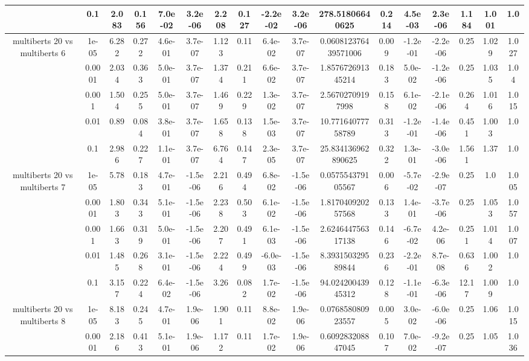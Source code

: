 \begin{tabular}{|c|c|c|c|c|c|c|c|c|c|c|c|c|c|c|c|c|}
 & 0.1 & 2.083 & 0.156 & 7.0e-02 & 3.2e-06 & 2.208 & 0.127 & -2.2e-02 & 3.2e-06 & 278.51806640625 & 0.214 & 4.5e-03 & 2.3e-06 & 1.184 & 1.001 & 1.0 \\
\hline
\multirow{5}{*}{multiberts 20 vs multiberts 6} & 1e-05 & 6.282 & 0.272 & 4.6e-01 & 3.7e-07 & 1.123 & 0.11 & 6.4e-02 & 3.7e-07 & 0.060812376439571006 & 0.009 & -1.2e-01 & -2.2e-06 & 0.25 & 1.029 & 1.027 \\
 & 0.0001 & 2.034 & 0.363 & 5.0e-01 & 3.7e-07 & 1.374 & 0.211 & 6.6e-02 & 3.7e-07 & 1.857672691345214 & 0.183 & 5.0e-02 & -1.2e-06 & 0.25 & 1.035 & 1.04 \\
 & 0.001 & 1.504 & 0.255 & 5.0e-01 & 3.7e-07 & 1.469 & 0.229 & 1.3e-02 & 3.7e-07 & 2.56702709197998 & 0.158 & 6.1e-02 & -2.1e-06 & 0.264 & 1.016 & 1.015 \\
 & 0.01 & 0.89 & 0.084 & 3.8e-01 & 3.7e-07 & 1.658 & 0.138 & 1.5e-03 & 3.7e-07 & 10.77164077758789 & 0.313 & -1.2e-01 & -1.4e-06 & 0.451 & 1.003 & 1.0 \\
 & 0.1 & 2.986 & 0.227 & 1.1e-01 & 3.7e-07 & 6.764 & 0.147 & 2.3e-05 & 3.7e-07 & 25.834136962890625 & 0.322 & 1.3e-01 & -3.0e-06 & 1.561 & 1.37 & 1.0 \\
\hline
\multirow{5}{*}{multiberts 20 vs multiberts 7} & 1e-05 & 5.78 & 0.183 & 4.7e-01 & -1.5e-06 & 2.216 & 0.494 & 6.8e-02 & -1.5e-06 & 0.057554379105567 & 0.006 & -5.7e-02 & -2.9e-07 & 0.25 & 1.0 & 1.005 \\
 & 0.0001 & 1.803 & 0.343 & 5.1e-01 & -1.5e-06 & 2.238 & 0.503 & 6.1e-02 & -1.5e-06 & 1.817040920257568 & 0.133 & 1.4e-01 & -3.7e-06 & 0.25 & 1.053 & 1.057 \\
 & 0.001 & 1.663 & 0.319 & 5.0e-01 & -1.5e-06 & 2.207 & 0.491 & 6.1e-03 & -1.5e-06 & 2.624644756317138 & 0.146 & -6.7e-02 & 4.2e-06 & 0.251 & 1.014 & 1.007 \\
 & 0.01 & 1.485 & 0.268 & 3.1e-01 & -1.5e-06 & 2.224 & 0.499 & -6.0e-03 & -1.5e-06 & 8.393150329589844 & 0.236 & -2.2e-01 & 8.7e-08 & 0.636 & 1.002 & 1.0 \\
 & 0.1 & 3.157 & 0.224 & 6.4e-02 & -1.5e-06 & 3.26 & 0.082 & 1.7e-02 & -1.5e-06 & 94.02420043945312 & 0.128 & -1.1e-01 & -6.3e-06 & 12.17 & 1.009 & 1.0 \\
\hline
\multirow{5}{*}{multiberts 20 vs multiberts 8} & 1e-05 & 8.183 & 0.245 & 4.7e-01 & 1.9e-06 & 1.901 & 0.11 & 8.8e-02 & 1.9e-06 & 0.076858080923557 & 0.005 & 3.0e-02 & -6.0e-06 & 0.25 & 1.06 & 1.015 \\
 & 0.0001 & 2.186 & 0.413 & 5.1e-01 & 1.9e-06 & 1.172 & 0.11 & 1.7e-02 & 1.9e-06 & 0.609283208847045 & 0.107 & 7.0e-02 & -9.2e-07 & 0.25 & 1.05 & 1.036 \\

\end{tabular}

